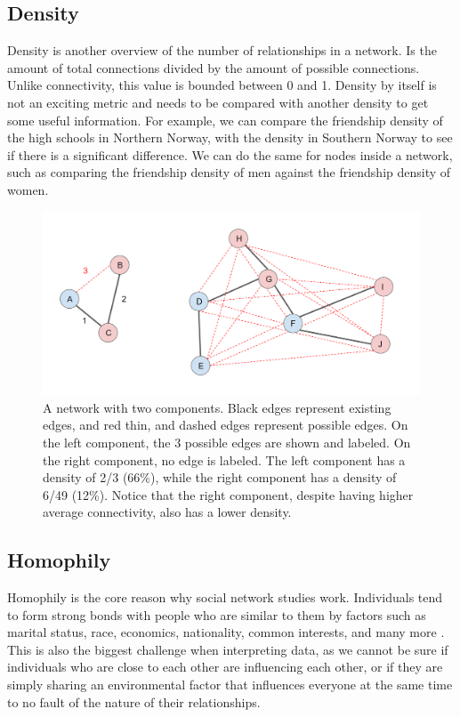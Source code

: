 \subsection{Density}

Density is another overview of the number of relationships in a network. Is the amount of total connections divided by the amount of possible connections. Unlike connectivity, this value is bounded between 0 and 1. Density by itself is not an exciting metric and needs to be compared with another density to get some useful information. For example, we can compare the friendship density of the high schools in Northern Norway, with the density in Southern Norway to see if there is a significant difference. We can do the same for nodes inside a network, such as comparing the friendship density of men against the friendship density of women.

    \begin{figure}[h]
        \centering
            \includegraphics[width=0.7\linewidth]{figures/Networks/Concepts/edgesDensity.png} 
        \caption{A network with two components. Black edges represent existing edges, and red thin, and dashed edges represent possible edges. On the left component, the 3 possible edges are shown and labeled. On the right component, no edge is labeled. The left component has a density of 2/3 (66\%), while the right component has a density of 6/49 (12\%). Notice that the right component, despite having higher average connectivity, also has a lower density.}
        \label{figure:networksDensity}
    \end{figure}    

\clearpage


\subsection{Homophily}
\label{network:homophily}

Homophily is the core reason why social network studies work. Individuals tend to form strong bonds with people who are similar to them by factors such as marital status, race, economics, nationality, common interests, and many more \cite{Stehl2013, Moody2001, Qian2007, Cheadle2012, McPherson1987, Sergio2009, Kossinets2009, McPherson2001, Smith2014, Karimi2018, Lee2019, Avin2020, Asikainen2020}. This is also the biggest challenge when interpreting data, as we cannot be sure if individuals who are close to each other are influencing each other, or if they are simply sharing an environmental factor that influences everyone at the same time to no fault of the nature of their relationships.

